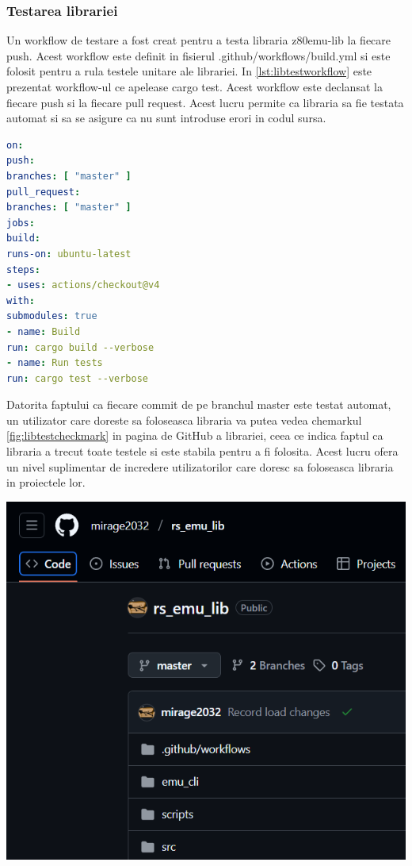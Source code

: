 \documentclass[titlepage,12pt]{article}
\DeclareRobustCommand{\code}[1]{{\ttfamily\small #1}}
\begin{document}
\subsubsection{Testarea librariei}
Un workflow de testare a fost creat pentru a testa libraria \code{z80emu-lib} la fiecare push. Acest workflow este definit in fisierul \code{.github/workflows/build.yml} si este folosit pentru a rula testele unitare ale librariei. In \cref{lst:libtestworkflow} este prezentat workflow-ul ce apelease \code{cargo test}. Acest workflow este declansat la fiecare push si la fiecare pull request. Acest lucru permite ca libraria sa fie testata automat si sa se asigure ca nu sunt introduse erori in codul sursa.
\begin{lstlisting}[language=yaml,caption={Workflow de testare a librariei},label={lst:libtestworkflow}]
on:
push:
branches: [ "master" ]
pull_request:
branches: [ "master" ]
jobs:
build:
runs-on: ubuntu-latest
steps:
- uses: actions/checkout@v4
with:
submodules: true
- name: Build
run: cargo build --verbose
- name: Run tests
run: cargo test --verbose
\end{lstlisting}

\begin{minipage}[c]{0.55\textwidth}
Datorita faptului ca fiecare commit de pe branchul \code{master} este testat automat, un utilizator care doreste sa foloseasca libraria va putea vedea chemarkul \cref{fig:libtestcheckmark} in pagina de GitHub a librariei, ceea ce indica faptul ca libraria a trecut toate testele si este stabila pentru a fi folosita. Acest lucru ofera un nivel suplimentar de incredere utilizatorilor care doresc sa foloseasca libraria in proiectele lor.
\end{minipage}
\hfill
\begin{minipage}[c]{0.4\textwidth}
\centering
\includegraphics[width=\textwidth]{images/libtestcheckmark.png}
\label{fig:libtestcheckmark}
\end{minipage}
\end{document}
